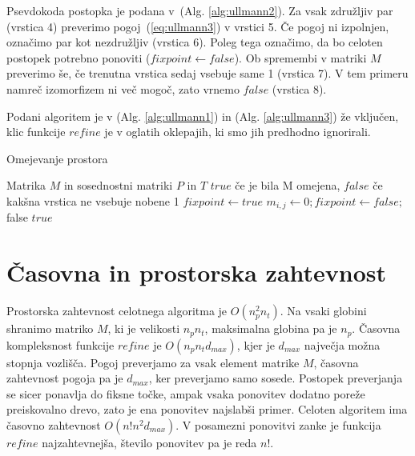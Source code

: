 \documentclass[a4paper, 12pt, ]{book}
\newcommand{\refalg}[1]{(Alg. \ref{#1})}
\begin{document}
	Psevdokoda postopka je podana v~\refalg{alg:ullmann2}. Za vsak
	združljiv par (vrstica 4) preverimo pogoj~(\ref{eq:ullmann3}) v vrstici 5. Če pogoj ni izpolnjen, označimo par kot nezdružljiv (vrstica 6). Poleg tega
	označimo, da bo celoten postopek potrebno ponoviti ($fixpoint \gets false$). Ob spremembi v matriki $M$ preverimo še, če trenutna vrstica sedaj vsebuje
	same 1 (vrstica 7). V tem primeru namreč izomorfizem ni več mogoč, zato vrnemo $false$ (vrstica 8). 

	Podani algoritem je v \refalg{alg:ullmann1} in \refalg{alg:ullmann3} že vključen, klic funkcije $refine$ je v oglatih oklepajih, ki smo jih predhodno
	ignorirali.

\begin{algorithm}
\caption{Omejevanje prostora}
\label{alg:ullmann2}
\begin{algorithmic}[1]
	\Require Matrika $M$ in sosednostni matriki $P$ in $T$
	\Ensure $true$ če je bila M omejena, $false$ če kakšna vrstica ne vsebuje nobene 1
		\Repeat
			\State $fixpoint \gets true$
					\State $m_{i,j} \gets 0; fixpoint \gets false;$
						\State \Return false
					\EndIf
				\EndIf
			\EndFor
		\State \Return $true$
	\EndProcedure
\end{algorithmic}
\end{algorithm}

	\section {Časovna in prostorska zahtevnost}
	Prostorska zahtevnost celotnega algoritma je $O(n_p^2 n_t)$. Na vsaki globini shranimo matriko $M$, ki je velikosti $n_p n_t$, maksimalna globina pa 
	je $n_p$. Časovna kompleksnost funkcije $refine$ je $O(n_p n_t d_{max})$, kjer je $d_{max}$ največja možna stopnja vozlišča. Pogoj preverjamo za
	vsak	element matrike $M$, časovna zahtevnost pogoja pa je $d_{max}$, ker preverjamo samo sosede. Postopek preverjanja se sicer ponavlja do fiksne
	točke, ampak vsaka ponovitev dodatno poreže preiskovalno drevo, zato je ena ponovitev najslabši primer. Celoten algoritem ima časovno zahtevnost
	$O(n! n^2 d_{max})$. V posamezni ponovitvi zanke je funkcija $refine$ najzahtevnejša, število ponovitev pa je reda $n!$.
\end{document}
